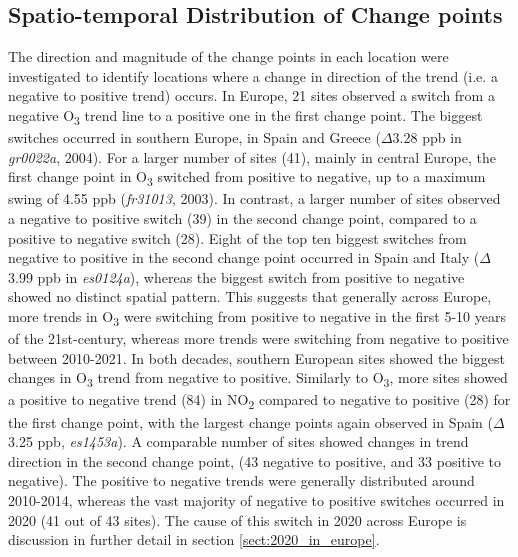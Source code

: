 \documentclass[journal abbreviation, manuscript]{copernicus}
\begin{document}
\clearpage

\subsection{Spatio-temporal Distribution of Change points} \label{sect:case_studies}


The direction and magnitude of the change points in each location were investigated to identify locations where a change in direction of the trend (i.e. a negative to positive trend) occurs. In Europe, 21 sites observed a switch from a negative O\textsubscript{3} trend line to a positive one in the first change point. The biggest switches occurred in southern Europe, in Spain and Greece ($\Delta$3.28 ppb in \textit{gr0022a}, 2004). For a larger number of sites (41), mainly in central Europe, the first change point in O\textsubscript{3} switched from positive to negative, up to a maximum swing of 4.55 ppb (\textit{fr31013}, 2003). In contrast, a larger number of sites observed a negative to positive switch (39) in the second change point, compared to a positive to negative switch (28). Eight of the top ten biggest switches from negative to positive in the second change point occurred in Spain and Italy ($\Delta$3.99 ppb in \textit{es0124a}), whereas the biggest switch from positive to negative showed no distinct spatial pattern. This suggests that generally across Europe, more trends in O\textsubscript{3} were switching from positive to negative in the first 5-10 years of the 21st-century, whereas more trends were switching from negative to positive between 2010-2021. In both decades, southern European sites showed the biggest changes in O\textsubscript{3} trend from negative to positive.
Similarly to O\textsubscript{3}, more sites showed a positive to negative trend (84) in NO\textsubscript{2} compared to negative to positive (28) for the first change point, with the largest change points again observed in Spain ($\Delta$3.25 ppb, \textit{es1453a}). A comparable number of sites showed changes in trend direction in the second change point, (43 negative to positive, and 33 positive to negative). The positive to negative trends were generally distributed around 2010-2014, whereas the vast majority of negative to positive switches occurred in 2020 (41 out of 43 sites). The cause of this switch in 2020 across Europe is discussion in further detail in section \ref{sect:2020_in_europe}.
\end{document}
